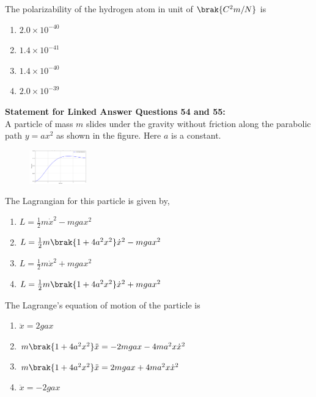 	\item The polarizability of the hydrogen atom in unit of $\brak{C^2m/N}$ is
    \begin{enumerate}
        \item $2.0 \times 10^{-40}$
        \item $1.4 \times 10^{-41}$
        \item $1.4 \times 10^{-40}$
        \item $2.0 \times 10^{-39}$
    \end{enumerate}

\textbf{Statement for Linked Answer Questions 54 and 55:}\\ 
 A particle of mass $m$ slides under the gravity without friction along the parabolic path $y = ax^2$ as shown in the figure. Here $a$ is a constant.\\
     \begin{figure}[!ht]
    \centering
    \includegraphics[width=2.5cm]{./GATE-yearwise/2009/figs/fig1.png}
    \end{figure}
\item The Lagrangian for this particle is given by,
    \begin{enumerate}
        \item $L = \frac{1}{2} m\dot{x}^2 - mgax^2$
	\item $L = \frac{1}{2} m\brak{1 + 4a^2x^2}\dot{x}^2 - mgax^2$
        \item $L = \frac{1}{2} m\dot{x}^2 + mgax^2$
	\item $L = \frac{1}{2} m\brak{1 + 4a^2x^2}\dot{x}^2 + mgax^2$
    \end{enumerate}

\item The Lagrange's equation of motion of the particle is
    \begin{enumerate}
        \item $\ddot{x} = 2gax$
	\item $m\brak{1 + 4a^2x^2}\ddot{x} = -2mgax - 4ma^2x\dot{x}^2$
	\item $m\brak{1 + 4a^2x^2}\ddot{x} = 2mgax + 4ma^2x\dot{x}^2$
        \item $\ddot{x} = -2gax$
    \end{enumerate}

